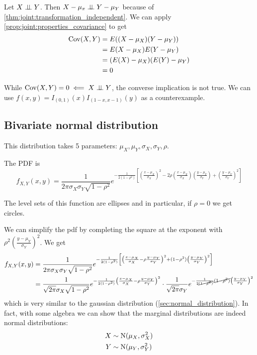 \documentclass[12pt]{extarticle}
\newcommand{\cov}{{\operatorfont Cov}}
\newcommand{\Normal}{{\operatorfont N}}
\begin{document}
\begin{proposition}
    Let $X \perp \!\!\! \perp Y$. Then $X - \mu_x \perp \!\!\! \perp Y -\mu_Y$ because of \autoref{thm:joint:transformation_independent}.
    We can apply \autoref{prop:joint:properties_covariance} to get
    \begin{align}
        \cov(X, Y) & = E((X - \mu_X)(Y - \mu_Y))    \\
                   & = E(X - \mu_X) E(Y - \mu_Y)    \\
                   & = (E(X) - \mu_X)(E(Y) - \mu_Y) \\
                   & = 0
    \end{align}
\end{proposition}

\begin{remark}
    While $\cov(X, Y) = 0 \impliedby X \indep Y$, the converse implication is not true.
    We can use $f(x, y) = I_{(0,1)}(x) I_{(1-x, x-1)}(y)$ as a counterexample.
\end{remark}

\subsection{Bivariate normal distribution}

This distribution takes 5 parameters: $\mu_X, \mu_Y, \sigma_X, \sigma_Y, \rho$.

The PDF is
\begin{equation}
    f_{X,Y}(x,y) = \frac{1}{2 \pi \sigma_X \sigma_Y \sqrt{1- \rho^2}} e^{-\frac{1}{2(1-\rho^2)} \left[ \left( \frac{x - \mu_X}{\sigma_X} \right)^2 -2 \rho \left( \frac{x-\mu_X}{\sigma_X} \right) \left( \frac{y-\mu_Y}{\sigma_Y} \right) + \left(\frac{y-\mu_Y}{\sigma_Y}\right)^2 \right]}
\end{equation}

The level sets of this function are ellipses and in particular, if $\rho = 0$ we get circles.

We can simplify the pdf by completing the square at the exponent with $\rho ^2 \left(\frac{y - \mu_Y}{\sigma_Y}\right)^2$. We get
\begin{align}
    f_{X,Y}(x,y) & = \frac{1}{2 \pi \sigma_X \sigma_Y \sqrt{1- \rho^2}} e^{-\frac{1}{2(1-\rho^2)} \left[ \left( \frac{x - \mu_X}{\sigma_X} - \rho \frac{y-\mu_Y}{\sigma_Y} \right)^2 + (1 - \rho^2) \left(\frac{y-\mu_Y}{\sigma_Y}\right)^2 \right]} \\
                 & = \frac{1}{\sqrt{2 \pi} \sigma_X \sqrt{1- \rho^2}} e^{-\frac{1}{2(1-\rho^2)} \left( \frac{x - \mu_X}{\sigma_X} - \rho \frac{y-\mu_Y}{\sigma_Y} \right)^2} \cdot
    \frac{1}{\sqrt{2 \pi} \sigma_Y} e^{-\frac{1}{2\cancel{(1-\rho^2)}} \cancel{(1 - \rho^2)} \left(\frac{y-\mu_Y}{\sigma_Y}\right)^2}
\end{align}
which is very similar to the gaussian distribution (\autoref{sec:normal_distribution}).
In fact, with some algebra we can show that the marginal distributions are indeed normal distributions:
\begin{align}
    X & \sim \Normal(\mu_X, \sigma_X^2) \\
    Y & \sim \Normal(\mu_Y, \sigma_Y^2)
\end{align}
\end{document}
